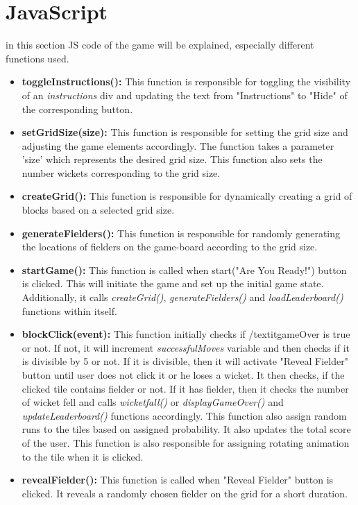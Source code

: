 \documentclass{article}
\begin{document}
\section{JavaScript}
in this section JS code of the game will be explained, especially different functions used. \autocite{3}
\begin{itemize}
\item  \textbf{toggleInstructions():} This function is responsible for toggling the visibility of an \textit{instructions} div and updating the text from "Instructions" to "Hide" of the corresponding button. 
\item \textbf{setGridSize(size):} This function is responsible for setting the grid size and adjusting the game elements accordingly. The function takes a parameter 'size' which represents the desired grid size. This function also sets the number wickets corresponding to the grid size.
\item \textbf{createGrid():} This function is responsible for dynamically creating a grid of blocks based on a selected grid size.
\item \textbf{generateFielders():} This function is responsible for randomly generating the locations of fielders on the game-board according to the grid size.
\item \textbf{startGame():} This function is called when start("Are You Ready!") button is clicked. This will initiate the game and set up the initial game state. Additionally, it calls \textit{createGrid()}, \textit{generateFielders()} and \textit{loadLeaderboard()} functions within itself.
\item \textbf{blockClick(event):} This function initially checks if /textit{gameOver} is true or not. If not, it will increment \textit{successfulMoves} variable and then checks if it is divisible by 5 or not. If it is divisible, then it will activate "Reveal Fielder" button until user does not click it or he loses a wicket. It then checks, if the clicked tile contains fielder or not. If it has fielder, then it checks the number of wicket fell and calls \textit{wicketfall()} or \textit{displayGameOver()} and \textit{updateLeaderboard()} functions accordingly. This function also assign random runs to the tiles based on assigned probability. It also updates the total score of the user. This function is also responsible for assigning rotating animation to the tile when it is clicked.
\item \textbf{revealFielder():} This function is called when "Reveal Fielder" button is clicked. It reveals a randomly chosen fielder on the grid for a short duration.

\end{itemize}
\end{document}
